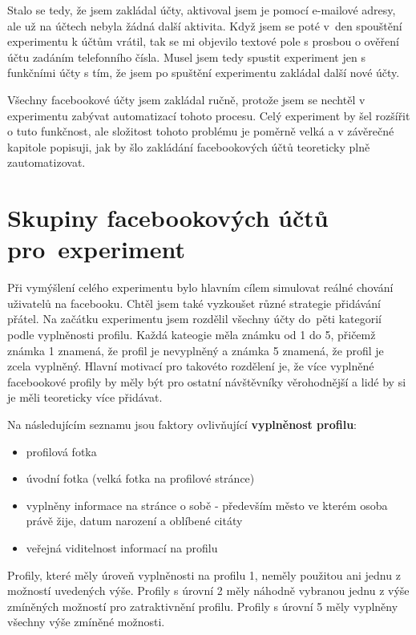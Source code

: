 \documentclass[thesis=M,czech]{FITthesis}[2013/05/10]
\begin{document}
Stalo se tedy, že jsem zakládal účty, aktivoval jsem je pomocí e-mailové adresy, ale už na účtech nebyla žádná další aktivita. Když jsem se poté v~den spouštění experimentu k účtům vrátil, tak se mi objevilo textové pole s prosbou o ověření účtu zadáním telefonního čísla. Musel jsem tedy spustit experiment jen s funkčními účty s tím, že jsem po spuštění experimentu zakládal další nové účty.

Všechny facebookové účty jsem zakládal ručně, protože jsem se nechtěl v experimentu zabývat automatizací tohoto procesu. Celý experiment by šel rozšířit o tuto funkčnost, ale složitost tohoto problému je poměrně velká a v závěrečné kapitole popisuji, jak by šlo zakládání facebookových účtů teoreticky plně zautomatizovat.

\section{Skupiny facebookových účtů pro~experiment}

Při vymýšlení celého experimentu bylo hlavním cílem simulovat reálné chování uživatelů na facebooku. Chtěl jsem také vyzkoušet různé strategie přidávání přátel. Na začátku experimentu jsem rozdělil všechny účty do~pěti kategorií podle vyplněnosti profilu. Každá kateogie měla známku od 1 do 5, přičemž známka 1 znamená, že profil je nevyplněný a známka 5 znamená, že profil je zcela vyplněný. Hlavní motivací pro takovéto rozdělení je, že více vyplněné facebookové profily by měly být pro ostatní návštěvníky věrohodnější a lidé by si je měli teoreticky více přidávat.

Na následujícím seznamu jsou faktory ovlivňující \textbf{vyplněnost profilu}:

\begin{itemize}
  \item profilová fotka
  \item úvodní fotka (velká fotka na profilové stránce)
  \item vyplněny informace na stránce o sobě - především město ve kterém osoba právě žije, datum narození a oblíbené citáty
  \item veřejná viditelnost informací na profilu
\end{itemize}

Profily, které měly úroveň vyplněnosti na profilu 1, neměly použitou ani jednu z možností uvedených výše. Profily s úrovní 2 měly náhodně vybranou jednu z výše zmíněných možností pro zatraktivnění profilu. Profily s úrovní 5 měly vyplněny všechny výše zmíněné možnosti.
\end{document}
